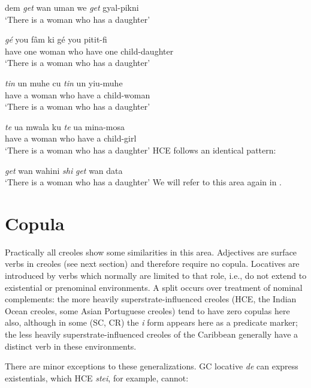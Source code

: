 \ea\label{ex:2:55}
 dem \textit{get} wan uman we \textit{get} gyal-pikni \\
\glt `There is a woman who has a daughter'
\z

\ea\label{ex:2:56}
\gll \textit{gé} you f{\^a}m ki gé you pitit-fi\\
have one woman who have one child-daughter\\
\glt `There is a woman who has a daughter'
\z

\ea\label{ex:2:57}
\gll \textit{tin} un muhe cu \textit{tin} un yiu-muhe\\
have a woman who have a child-woman \\
\glt `There is a woman who has a daughter'
\z

\ea\label{ex:2:58}
 \gll \textit{te} ua mwala ku \textit{te} ua mina-mosa \\
have a woman who have a child-girl\\
\glt `There is a woman who has a daughter'
\z
HCE follows an identical pattern:

\ea\label{ex:2:59}
 \textit{get} wan wahini \textit{shi} \textit{get} wan data\\
\glt `There is a woman who has a daughter' 
\z
We will refer to this area again in .

\section{Copula}

Practically all creoles show some similarities in this area. Adjec\-tives are surface verbs in creoles (see next section) and therefore require no copula. Locatives are introduced by verbs which normally are limited to that role, i.e., do not extend to existential or prenominal environments. A split occurs over treatment of nominal complements: the more heavily superstrate-influenced creoles (HCE, the Indian Ocean creoles, some Asian Portuguese creoles) tend to have zero copulas here also, although in some (SC, CR) the \textit{i} form appears here as a predicate marker; the less heavily superstrate-influenced creoles of the Caribbean generally have a distinct verb in these environments.

There are minor exceptions to these generalizations. GC locative \textit{de} can express existentials, which HCE \textit{stei}, for example, cannot:

\z

